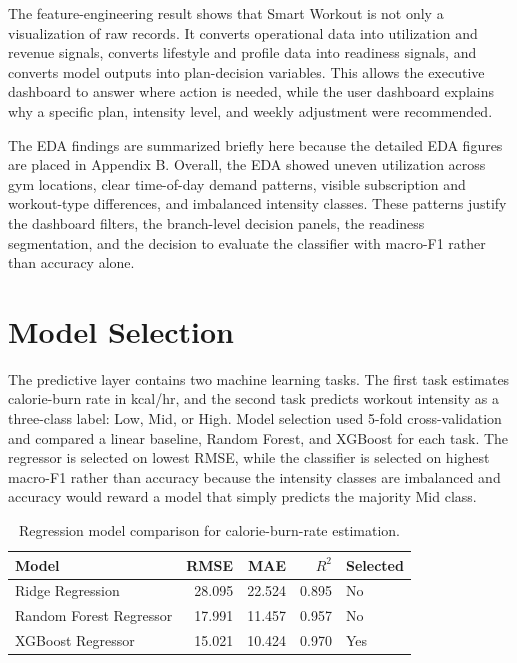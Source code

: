 \documentclass{aitthesis}
\begin{document}
The feature-engineering result shows that Smart Workout is not only a visualization of raw records. It converts operational data into utilization and revenue signals, converts lifestyle and profile data into readiness signals, and converts model outputs into plan-decision variables. This allows the executive dashboard to answer where action is needed, while the user dashboard explains why a specific plan, intensity level, and weekly adjustment were recommended.

The EDA findings are summarized briefly here because the detailed EDA figures are placed in Appendix B. Overall, the EDA showed uneven utilization across gym locations, clear time-of-day demand patterns, visible subscription and workout-type differences, and imbalanced intensity classes. These patterns justify the dashboard filters, the branch-level decision panels, the readiness segmentation, and the decision to evaluate the classifier with macro-F1 rather than accuracy alone.
\section{Model Selection}
\label{sec:model_selection}

The predictive layer contains two machine learning tasks. The first task estimates calorie-burn rate in kcal/hr, and the second task predicts workout intensity as a three-class label: Low, Mid, or High. Model selection used 5-fold cross-validation and compared a linear baseline, Random Forest, and XGBoost for each task. The regressor is selected on lowest RMSE, while the classifier is selected on highest macro-F1 rather than accuracy because the intensity classes are imbalanced and accuracy would reward a model that simply predicts the majority Mid class.

\begin{table}[htbp]
\centering
\small
\caption{Regression model comparison for calorie-burn-rate estimation.}
\label{tab:chapter4_regression_results}
\begin{tabular}{lrrrl}
\toprule
\textbf{Model} & \textbf{RMSE} & \textbf{MAE} & \textbf{$R^2$} & \textbf{Selected} \\
\midrule
Ridge Regression & 28.095 & 22.524 & 0.895 & No \\
Random Forest Regressor & 17.991 & 11.457 & 0.957 & No \\
XGBoost Regressor & 15.021 & 10.424 & 0.970 & Yes \\
\bottomrule
\end{tabular}
\end{table}
\end{document}

